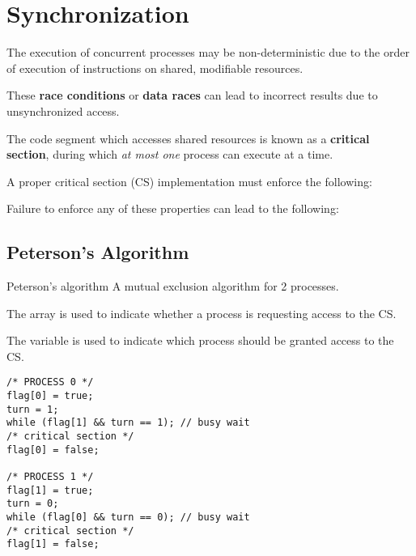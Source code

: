 \section{Synchronization}
The execution of concurrent processes may be non-deterministic due to the order of execution of instructions on shared, modifiable resources.

These \textbf{race conditions} or \textbf{data races} can lead to incorrect results due to unsynchronized access.

The code segment which accesses shared resources is known as a \textbf{critical section},
during which \textit{at most one} process can execute at a time.

A proper critical section (CS) implementation must enforce the following:
\begin{itemize*}
\end{itemize*}

Failure to enforce any of these properties can lead to the following:
\begin{itemize*}
\end{itemize*}

\subsection{Peterson's Algorithm}
\begin{defn}{Peterson's algorithm}
    A mutual exclusion algorithm for 2 processes.

    \begin{itemize}
    \end{itemize}

    The  array is used to indicate whether a process is requesting access to the CS.

    The  variable is used to indicate which process should be granted access to the CS.

    \begin{lstlisting}
/* PROCESS 0 */
flag[0] = true;
turn = 1;
while (flag[1] && turn == 1); // busy wait
/* critical section */
flag[0] = false;

/* PROCESS 1 */
flag[1] = true;
turn = 0;
while (flag[0] && turn == 0); // busy wait
/* critical section */
flag[1] = false;
    \end{lstlisting}
\end{defn}

